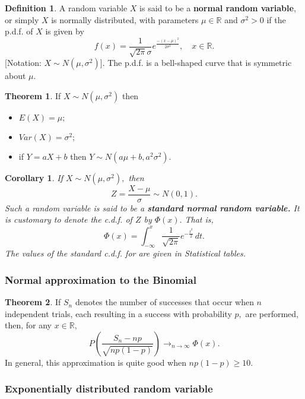 \documentclass[12pt, a4paper]{article}
\newcommand{\bb}[1]{\mathbb{#1}}
\theoremstyle{definition}
\newtheorem{definition}{Definition}[section]
\newtheorem{theorem}{Theorem}[section]
\theoremstyle{plain}
\newtheorem{corollary}{Corollary}[theorem]
\begin{document}
\begin{definition}
A random variable $X$ is said to be a \textbf{normal random variable}, or simply $X$ is normally distributed, with parameters $\mu \in \bb{R}$ and $\sigma^2 >0$ if the p.d.f. of $X$ is given by $$f(x)=\frac{1}{\sqrt{2\pi}\sigma}e^{\frac{-(x-\mu)^2}{2\sigma^2}}, \quad x\in \bb{R}.$$ [Notation: $X\sim N(\mu,\sigma^2)$]. 
The p.d.f. is a bell-shaped curve that is symmetric about $\mu$.
\end{definition}

\begin{theorem}
If $X\sim N(\mu,\sigma^2)$ then \begin{itemize}

	\item $E(X)=\mu;$
	\item $Var(X)=\sigma^2;$
	\item if $Y=aX+b$ then $Y\sim N(a\mu+b,a^2\sigma^2).$

\end{itemize}
\end{theorem}

\begin{corollary}
If $X\sim N(\mu,\sigma^2),$ then $$Z=\frac{X-\mu}{\sigma}\sim N(0,1).$$ Such a random variable is said to be a \textbf{standard normal random variable.} It is customary to denote the c.d.f. of $Z$ by $\Phi(x).$ That is, $$\Phi(x)=\int_{-\infty}^{x} \frac{1}{\sqrt{2\pi}}e^{-\frac{t^2}{2}}\,dt.$$ The values of the standard c.d.f. for are given in Statistical tables.

\end{corollary}

\subsubsection{Normal approximation to the Binomial}

\begin{theorem}
If $S_n$ denotes the number of successes that occur when $n$ independent trials, each resulting in a success with probability $p,$ are performed, then, for any $x \in \bb{R},$ $$P\left(\frac{S_n-np}{\sqrt{np(1-p)}}\right)\to_{n\to\infty}\Phi(x).$$ In general, this approximation is quite good when $np(1 - p) \geq 10.$
 
\end{theorem}


\subsubsection{Exponentially distributed random variable}
\end{document}
